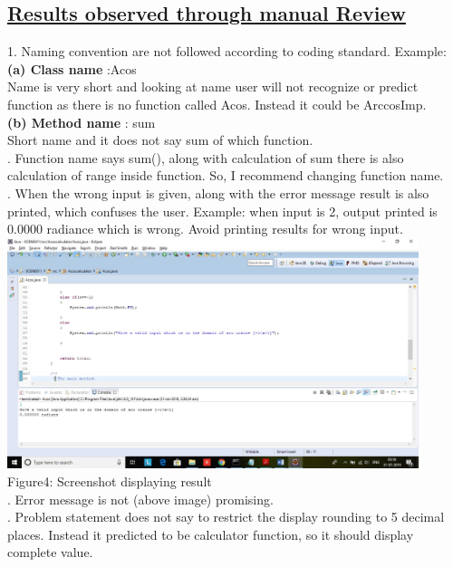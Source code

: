 \documentclass[a4paper,12pt]{article}
\begin{document}
\begin{titlepage}
\subsection{\underline{\textbf{Results observed through manual Review}}}
1.	Naming convention are not followed according to coding standard. Example: \\
\textbf{(a) Class name} :Acos \\
Name is very short  and  looking at name user will not recognize or predict   function as there is no function called Acos. Instead it could be ArccosImp.\\
\textbf{(b) Method name} : sum\\
Short name and it does not say sum of which function.\\
.	Function name says sum(), along with calculation of sum there is also calculation of range inside function. So, I recommend changing function name.\\
.	When the wrong input is given, along with the error message result is also printed, which confuses the user. Example: when input is 2, output printed is 0.0000 radiance which is wrong. Avoid printing results for wrong input.\\
\newline
\includegraphics[width=12.0cm]{Fig4.jpg}\\
Figure4: Screenshot displaying result \\
. Error message is not (above image) promising.\\
.	Problem statement does not say to restrict the display rounding to 5 decimal places. Instead it predicted to be calculator function, so it should display complete value.\\

\end{titlepage}
\end{document}
